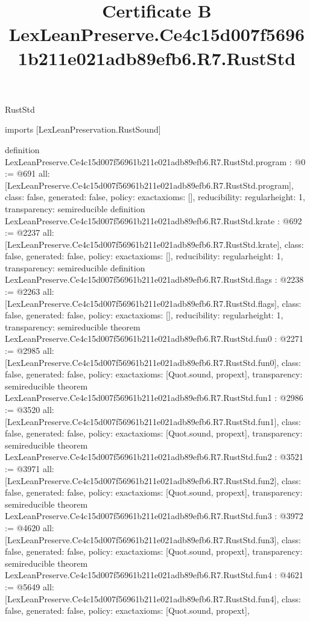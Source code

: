 \begin{lexlean}{RustStd}
\title{Certificate B LexLeanPreserve.Ce4c15d007f56961b211e021adb89efb6.R7.RustStd}
\begin{coremodule}
imports [LexLeanPreservation.RustSound]

definition LexLeanPreserve.Ce4c15d007f56961b211e021adb89efb6.R7.RustStd.program : @0 := @691 {
  all: [LexLeanPreserve.Ce4c15d007f56961b211e021adb89efb6.R7.RustStd.program],
  class: false,
  generated: false,
  policy: exact{axioms: []},
  reducibility: regular{height: 1},
  transparency: semireducible
}
definition LexLeanPreserve.Ce4c15d007f56961b211e021adb89efb6.R7.RustStd.krate : @692 := @2237 {
  all: [LexLeanPreserve.Ce4c15d007f56961b211e021adb89efb6.R7.RustStd.krate],
  class: false,
  generated: false,
  policy: exact{axioms: []},
  reducibility: regular{height: 1},
  transparency: semireducible
}
definition LexLeanPreserve.Ce4c15d007f56961b211e021adb89efb6.R7.RustStd.flags : @2238 := @2263 {
  all: [LexLeanPreserve.Ce4c15d007f56961b211e021adb89efb6.R7.RustStd.flags],
  class: false,
  generated: false,
  policy: exact{axioms: []},
  reducibility: regular{height: 1},
  transparency: semireducible
}
theorem LexLeanPreserve.Ce4c15d007f56961b211e021adb89efb6.R7.RustStd.fun0 : @2271 := @2985 {
  all: [LexLeanPreserve.Ce4c15d007f56961b211e021adb89efb6.R7.RustStd.fun0],
  class: false,
  generated: false,
  policy: exact{axioms: [Quot.sound, propext]},
  transparency: semireducible
}
theorem LexLeanPreserve.Ce4c15d007f56961b211e021adb89efb6.R7.RustStd.fun1 : @2986 := @3520 {
  all: [LexLeanPreserve.Ce4c15d007f56961b211e021adb89efb6.R7.RustStd.fun1],
  class: false,
  generated: false,
  policy: exact{axioms: [Quot.sound, propext]},
  transparency: semireducible
}
theorem LexLeanPreserve.Ce4c15d007f56961b211e021adb89efb6.R7.RustStd.fun2 : @3521 := @3971 {
  all: [LexLeanPreserve.Ce4c15d007f56961b211e021adb89efb6.R7.RustStd.fun2],
  class: false,
  generated: false,
  policy: exact{axioms: [Quot.sound, propext]},
  transparency: semireducible
}
theorem LexLeanPreserve.Ce4c15d007f56961b211e021adb89efb6.R7.RustStd.fun3 : @3972 := @4620 {
  all: [LexLeanPreserve.Ce4c15d007f56961b211e021adb89efb6.R7.RustStd.fun3],
  class: false,
  generated: false,
  policy: exact{axioms: [Quot.sound, propext]},
  transparency: semireducible
}
theorem LexLeanPreserve.Ce4c15d007f56961b211e021adb89efb6.R7.RustStd.fun4 : @4621 := @5649 {
  all: [LexLeanPreserve.Ce4c15d007f56961b211e021adb89efb6.R7.RustStd.fun4],
  class: false,
  generated: false,
  policy: exact{axioms: [Quot.sound, propext]},
}
\end{coremodule}
\end{lexlean}
